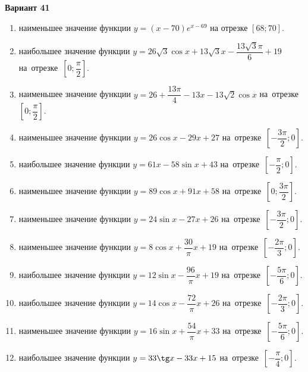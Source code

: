 \documentclass[a4paper,10pt]{article}
\begin{document}
\begin{center}\Large\textbf{Вариант 41}\end{center}

\begin{enumerate}
\item {} наименьшее значение функции $y = \left(x-70\right)e^{x-69}$ на отрезке $\left[68;70\right]$.

\item {} наибольшее значение функции $y = 26\sqrt{3}\cos x+13\sqrt{3}x-\dfrac{13\sqrt{3}\pi}{6} +19$ на~отрезке~$\left[0;\dfrac{\pi }{2}\right]$.

\item {} наименьшее значение функции $y = 26+\dfrac{13 \pi}{4}-13x-13\sqrt{2}\cos x$ на~отрезке~$\left[0;\dfrac{\pi }{2}\right]$.

\item {} наименьшее значение функции $y = 26\cos x-29x+27$ на~отрезке~$\left[-\dfrac{3\pi }{2};0\right]$.

\item {} наибольшее значение функции $y = 61x-58\sin x+43$ на~отрезке~$\left[-\dfrac{\pi }{2};0\right]$.

\item {} наименьшее значение функции $y = 89\cos x+91x+58$ на~отрезке~$\left[0;\dfrac{3\pi }{2}\right]$.

\item {} наименьшее значение функции $y = 24\sin x-27x+26$ на~отрезке~$\left[-\dfrac{3\pi }{2};0\right]$.

\item {} наименьшее значение функции $y = 8\cos x+\dfrac{30}{\pi }x +19$ на~отрезке~$\left[-\dfrac{2\pi }{3};0\right]$.

\item {} наибольшее значение функции $y = 12\sin x-\dfrac{96}{\pi }x+19$ на~отрезке~$\left[-\dfrac{5\pi }{6};0\right]$.

\item {} наибольшее значение функции $y = 14\cos x-\dfrac{72}{\pi }x+26$ на~отрезке~$\left[-\dfrac{2\pi }{3};0\right]$.

\item {} наименьшее значение функции $y = 16\sin x+\dfrac{54}{\pi }x+33$ на~отрезке~$\left[-\dfrac{5\pi }{6};0\right]$.

\item {} наибольшее значение функции $y = 33\tg x-33x+15$ на~отрезке~$\left[-\dfrac{\pi }{4};0\right]$.


\end{enumerate}
\end{document}
